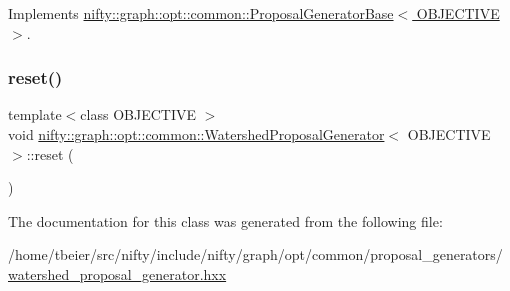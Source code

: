 Implements \hyperlink{classnifty_1_1graph_1_1opt_1_1common_1_1ProposalGeneratorBase_abb7b02d650049f52733b3f2dc81bb395}{nifty\+::graph\+::opt\+::common\+::\+Proposal\+Generator\+Base$<$ O\+B\+J\+E\+C\+T\+I\+V\+E $>$}.

\mbox{\label{classnifty_1_1graph_1_1opt_1_1common_1_1WatershedProposalGenerator_a93174a3bd752d4c2cf2a3eabce5d740c}} 
\subsubsection{\texorpdfstring{reset()}{reset()}}
{\footnotesize\ttfamily template$<$class O\+B\+J\+E\+C\+T\+I\+VE $>$ \\
void \hyperlink{classnifty_1_1graph_1_1opt_1_1common_1_1WatershedProposalGenerator}{nifty\+::graph\+::opt\+::common\+::\+Watershed\+Proposal\+Generator}$<$ O\+B\+J\+E\+C\+T\+I\+VE $>$\+::reset (\begin{DoxyParamCaption}{ }\end{DoxyParamCaption})\hspace{0.3cm}{\ttfamily [inline]}}



The documentation for this class was generated from the following file\+:\begin{DoxyCompactItemize}
\item 
/home/tbeier/src/nifty/include/nifty/graph/opt/common/proposal\+\_\+generators/\hyperlink{common_2proposal__generators_2watershed__proposal__generator_8hxx}{watershed\+\_\+proposal\+\_\+generator.\+hxx}\end{DoxyCompactItemize}
